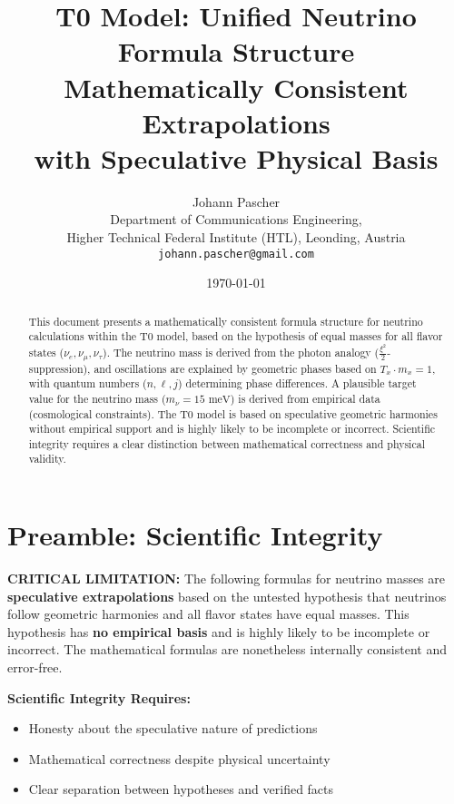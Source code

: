 \documentclass[12pt,a4paper]{article}
\title{\Huge\textbf{T0 Model: Unified Neutrino Formula Structure}\\
	\Large Mathematically Consistent Extrapolations \\
	with Speculative Physical Basis}
\author{Johann Pascher\\
	Department of Communications Engineering, \\
	Higher Technical Federal Institute (HTL), Leonding, Austria\\
	\texttt{johann.pascher@gmail.com}}
\date{\today}
\newcommand{\xipar}{\xi}
\begin{document}
	
	\maketitle
	
	\begin{abstract}
		This document presents a mathematically consistent formula structure for neutrino calculations within the T0 model, based on the hypothesis of equal masses for all flavor states (\(\nu_e, \nu_\mu, \nu_\tau\)). The neutrino mass is derived from the photon analogy (\(\frac{\xipar^2}{2}\)-suppression), and oscillations are explained by geometric phases based on \( T_x \cdot m_x = 1 \), with quantum numbers (\(n, \ell, j\)) determining phase differences. A plausible target value for the neutrino mass (\(m_\nu = 15 \text{ meV}\)) is derived from empirical data (cosmological constraints). The T0 model is based on speculative geometric harmonies without empirical support and is highly likely to be incomplete or incorrect. Scientific integrity requires a clear distinction between mathematical correctness and physical validity.
	\end{abstract}
	
	\tableofcontents
	\newpage
	
	\section{Preamble: Scientific Integrity}
	
	\begin{warning}
		\textbf{CRITICAL LIMITATION:} The following formulas for neutrino masses are \textbf{speculative extrapolations} based on the untested hypothesis that neutrinos follow geometric harmonies and all flavor states have equal masses. This hypothesis has \textbf{no empirical basis} and is highly likely to be incomplete or incorrect. The mathematical formulas are nonetheless internally consistent and error-free.
		
		\vspace{0.5cm}
		\textbf{Scientific Integrity Requires:}
		\begin{itemize}
			\item Honesty about the speculative nature of predictions
			\item Mathematical correctness despite physical uncertainty
			\item Clear separation between hypotheses and verified facts
		\end{itemize}
	\end{warning}
	
\end{document}
